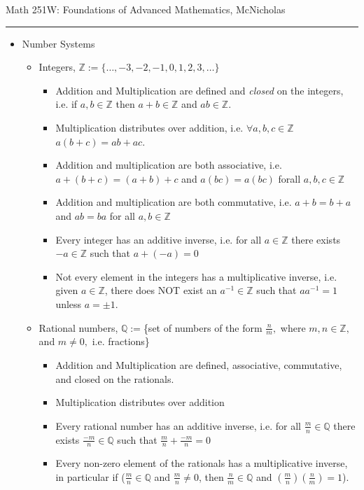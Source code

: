 \documentclass{article}
\newcommand{\Z}{\mathbb{Z}}
\newcommand{\Q}{\mathbb{Q}}
\begin{document}
	\newpage
	\hfill\small{Math 251W: Foundations of Advanced Mathematics, McNicholas}
	\vspace{0.5cm}
	\hrule
	\vspace{0.5cm}
	\large{
	\normalsize
	\begin{itemize}
		\item[]  Number Systems
		\begin{itemize}
			\item[]  Integers, $\Z:=\{\ldots, -3, -2, -1, 0, 1, 2, 3, \ldots\}$
			\begin{itemize}
				\item Addition and Multiplication are defined and \emph{closed} on the integers, i.e. if $a,b\in \Z$ then $a+b\in \Z$ and $ab\in\Z$.
				\item Multiplication distributes over addition, i.e. $\forall a,b,c\in\Z$ $a(b+c)=ab+ac.$
				\item Addition and multiplication are both associative, i.e. $a+(b+c)=(a+b)+c$ and $a(bc)=a(bc)$ forall $a,b,c\in\Z$
				\item Addition and multiplication are both commutative, i.e. $a+b=b+a$ and $ab=ba$ for all $a,b\in\Z$
				\item Every integer has an additive inverse, i.e. for all $a\in\Z$ there exists $-a\in\Z$ such that $a+(-a)=0$
				\item Not every element in the integers has a multiplicative inverse, i.e. given $a\in\Z$, there does NOT exist an $a^{-1}\in\Z$ such that $aa^{-1}=1$ unless $a=\pm 1.$
			\end{itemize}
			\item[]  Rational numbers, $\Q:=$\{set of numbers of the form $\frac{n}{m},$ where $m,n\in\Z,$ and $m\not=0,$ i.e. fractions\}
			\begin{itemize}
				\item Addition and Multiplication are defined, associative, commutative, and closed on the rationals.
				\item Multiplication distributes over addition
				\item Every rational number has an additive inverse, i.e. for all $\frac{m}{n}\in\Q$ there exists $\frac{-m}{n}\in\Q$ such that $\frac{m}{n}+\frac{-m}{n}=0$
				\item Every non-zero element of the rationals has a multiplicative inverse, in particular if  ($\frac{m}{n}\in\Q$ and $\frac{m}{n}\not=0$, then $\frac{n}{m}\in\Q$ and $(\frac{m}{n})(\frac{n}{m})=1$).
			\end{itemize}

\end{itemize}
\end{itemize}}
\end{document}
